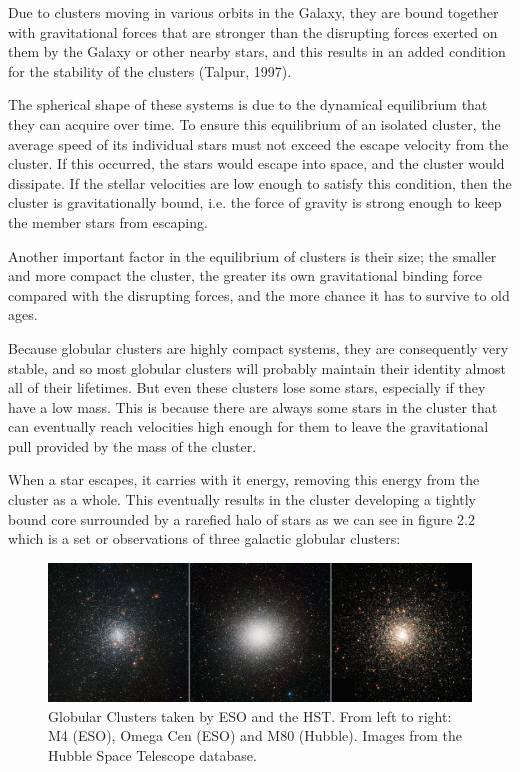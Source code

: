 Due to clusters moving in various orbits in the Galaxy, they are bound together with gravitational forces that are stronger than the disrupting forces exerted on them by the Galaxy or other nearby stars, and this results in an added condition for the stability of the clusters (Talpur, 1997).

The spherical shape of these systems is due to the dynamical equilibrium that they can acquire over time. To ensure this equilibrium of an isolated cluster, the average speed of its individual stars must not exceed the escape velocity from the cluster. If this occurred, the stars would escape into space, and the cluster would dissipate. If the stellar velocities are low enough to satisfy this condition, then the cluster is gravitationally bound, i.e. the force of gravity is strong enough to keep the member stars from escaping.

Another important factor in the equilibrium of clusters is their size; the smaller and more compact the cluster, the greater its own gravitational binding force compared with the disrupting forces, and the more chance it has to survive to old ages.

Because globular clusters are highly compact systems, they are consequently very stable, and so most globular clusters will probably maintain their identity almost all of their lifetimes. But even these clusters lose some stars, especially if they have a low mass. This is because there are always some stars in the cluster that can eventually reach velocities high enough for them to leave the gravitational pull provided by the mass of the cluster.

When a star escapes, it carries with it energy, removing this energy from the cluster as a whole. This eventually results in the cluster developing a tightly bound core surrounded by a rarefied halo of stars as we can see in figure 2.2 which is a set or observations of three galactic globular clusters:

\begin{figure}[H]
\centering
\includegraphics[width=14.5cm]{images/3_gcs.png}
\caption[ESO and Hubble images of Globular Clusters]{Globular Clusters taken by ESO and the HST. From left to right: M4 (ESO), Omega Cen (ESO) and M80 (Hubble). Images from the Hubble Space Telescope database.}
\end{figure}

